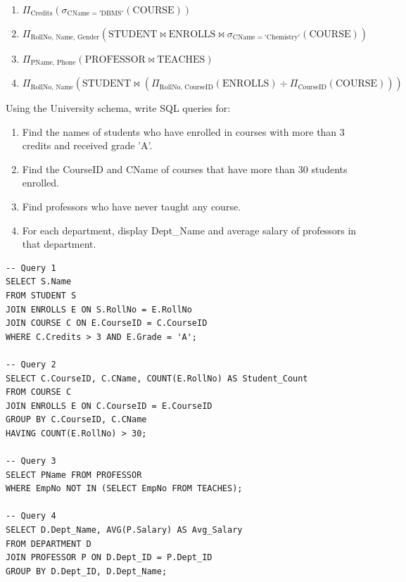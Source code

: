 \documentclass[11pt,a4paper]{article}
\newenvironment{Problem}[1][Problem Scenario]{\begin{tcolorbox}[problembox, title=#1]}{\end{tcolorbox}}
\newenvironment{Solution}[1][Step-by-Step Solution]{\begin{tcolorbox}[solbox, title=#1]}{\end{tcolorbox}}
\begin{document}
\begin{Solution}
\begin{enumerate}
  \item $\Pi_{\text{Credits}}\left( \sigma_{\text{CName} = '\text{DBMS}'}(\text{COURSE}) \right)$
  \item $\Pi_{\text{RollNo, Name, Gender}}\left( \text{STUDENT} \bowtie \text{ENROLLS} \bowtie \sigma_{\text{CName} = '\text{Chemistry}'}(\text{COURSE}) \right)$
  \item $\Pi_{\text{PName, Phone}}\left( \text{PROFESSOR} \bowtie \text{TEACHES} \right)$
  \item $\Pi_{\text{RollNo, Name}}\left( \text{STUDENT} \bowtie \left( \Pi_{\text{RollNo, CourseID}}(\text{ENROLLS}) \div \Pi_{\text{CourseID}}(\text{COURSE}) \right) \right)$
\end{enumerate}
\end{Solution}

\begin{Problem}[Problem 3: Advanced SQL Queries with Aggregations and Subqueries]
Using the University schema, write SQL queries for:
\begin{enumerate}
  \item Find the names of students who have enrolled in courses with more than 3 credits and received grade 'A'.
  \item Find the CourseID and CName of courses that have more than 30 students enrolled.
  \item Find professors who have never taught any course.
  \item For each department, display Dept\_Name and average salary of professors in that department.
\end{enumerate}
\end{Problem}

\begin{Solution}
\begin{lstlisting}
-- Query 1
SELECT S.Name 
FROM STUDENT S 
JOIN ENROLLS E ON S.RollNo = E.RollNo 
JOIN COURSE C ON E.CourseID = C.CourseID 
WHERE C.Credits > 3 AND E.Grade = 'A';

-- Query 2
SELECT C.CourseID, C.CName, COUNT(E.RollNo) AS Student_Count 
FROM COURSE C 
JOIN ENROLLS E ON C.CourseID = E.CourseID 
GROUP BY C.CourseID, C.CName 
HAVING COUNT(E.RollNo) > 30;

-- Query 3
SELECT PName FROM PROFESSOR 
WHERE EmpNo NOT IN (SELECT EmpNo FROM TEACHES);

-- Query 4
SELECT D.Dept_Name, AVG(P.Salary) AS Avg_Salary 
FROM DEPARTMENT D 
JOIN PROFESSOR P ON D.Dept_ID = P.Dept_ID 
GROUP BY D.Dept_ID, D.Dept_Name;
\end{lstlisting}
\end{Solution}
\end{document}
